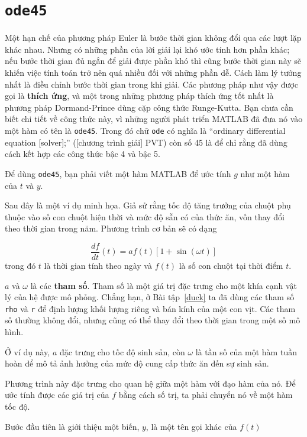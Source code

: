 \documentclass[12pt]{book}
\begin{document}
\section{{\tt ode45}}
\label{ode45}

Một hạn chế của phương pháp Euler là bước thời gian không đổi qua
các lượt lặp khác nhau. Nhưng có những phần của lời giải lại khó
ước tính hơn phần khác; nếu bước thời gian đủ ngắn để giải được
phần khó thì cũng bước thời gian này sẽ khiến việc tính toán trở nên
quá nhiều đối với những phần dễ. Cách làm lý tưởng nhất là điều 
chỉnh bước thời gian trong khi giải. Các phương pháp như vậy được
gọi là {\bf thích ứng}, và một trong những phương pháp thích ứng
tốt nhất là phương pháp Dormand-Prince dùng cặp công thức 
Runge-Kutta. Bạn chưa cần biết chi tiết về công thức này, vì những
người phát triển MATLAB đã đưa nó vào một hàm có tên là 
{\tt ode45}.  Trong đó chữ {\tt ode} có nghĩa là ``ordinary differential
equation [solver];'' ([chương trình giải] PVT) còn số 45 là để chỉ
rằng đã dùng cách kết hợp các công thức bậc 4 và bậc 5.

Để dùng {\tt ode45}, bạn phải viết một hàm MATLAB để ước tính
$g$ như một hàm của $t$ và $y$.


Sau đây là một ví dụ minh họa. Giả sử rằng tốc độ tăng trưởng của
chuột phụ thuộc vào số con chuột hiện thời và mức độ sẵn có của
thức ăn, vốn thay đổi theo thời gian trong năm.
Phương trình cơ bản sẽ có dạng

\[ \frac{df}{dt}(t) = a f(t) \left[1 + \sin (\omega t) \right] \]
%
\noindent trong đó $t$ là thời gian tính theo ngày và $f(t)$ là 
số con chuột tại thời điểm $t$.

$a$ và $\omega$ là các {\bf tham số}. Tham số là một giá trị 
đặc trưng cho một khía cạnh vật lý của hệ được mô phỏng. 
Chẳng hạn, ở Bài tập~\ref{duck} ta đã dùng các tham số {\tt rho} 
và {\tt r} để định lượng khối lượng riêng và bán kính của một
con vịt. Các tham số thường không đổi, nhưng cũng có thể
thay đổi theo thời gian trong một số mô hình.

Ở ví dụ này, $a$ đặc trưng cho tốc độ sinh sản, còn $\omega$
là tần số của một hàm tuần hoàn để mô tả ảnh hưởng của mức
độ cung cấp thức ăn đến sự sinh sản.

Phương trình này đặc trưng cho quan hệ giữa một hàm với
đạo hàm của nó. Để ước tính được các giá trị của $f$ bằng cách
số trị, ta phải chuyển nó về một hàm tốc độ.

Bước đầu tiên là giới thiệu một biến, $y$, là một tên gọi khác 
của $f(t)$
\end{document}
